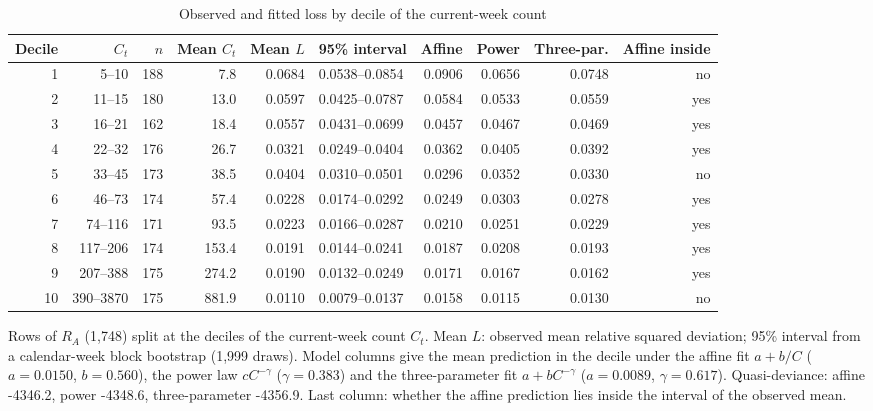 \begin{table}[!tbp]
\centering
\scriptsize\renewcommand{\arraystretch}{1.15}
\setlength{\tabcolsep}{3pt}
\caption{Observed and fitted loss by decile of the current-week count}
\label{tab:r2-deciles}
\begin{tabularx}{\linewidth}{@{}rrrrrlrrrr@{}}
\toprule
Decile & $C_t$ & $n$ & Mean $C_t$ & Mean $L$ & 95\% interval & Affine & Power & Three-par. & Affine inside \\
\midrule
1 & 5--10 & 188 & 7.8 & 0.0684 & 0.0538--0.0854 & 0.0906 & 0.0656 & 0.0748 & no \\
2 & 11--15 & 180 & 13.0 & 0.0597 & 0.0425--0.0787 & 0.0584 & 0.0533 & 0.0559 & yes \\
3 & 16--21 & 162 & 18.4 & 0.0557 & 0.0431--0.0699 & 0.0457 & 0.0467 & 0.0469 & yes \\
4 & 22--32 & 176 & 26.7 & 0.0321 & 0.0249--0.0404 & 0.0362 & 0.0405 & 0.0392 & yes \\
5 & 33--45 & 173 & 38.5 & 0.0404 & 0.0310--0.0501 & 0.0296 & 0.0352 & 0.0330 & no \\
6 & 46--73 & 174 & 57.4 & 0.0228 & 0.0174--0.0292 & 0.0249 & 0.0303 & 0.0278 & yes \\
7 & 74--116 & 171 & 93.5 & 0.0223 & 0.0166--0.0287 & 0.0210 & 0.0251 & 0.0229 & yes \\
8 & 117--206 & 174 & 153.4 & 0.0191 & 0.0144--0.0241 & 0.0187 & 0.0208 & 0.0193 & yes \\
9 & 207--388 & 175 & 274.2 & 0.0190 & 0.0132--0.0249 & 0.0171 & 0.0167 & 0.0162 & yes \\
10 & 390--3870 & 175 & 881.9 & 0.0110 & 0.0079--0.0137 & 0.0158 & 0.0115 & 0.0130 & no \\
\bottomrule
\end{tabularx}
\par\smallskip\parbox{\linewidth}{\scriptsize\linespread{1.15}\selectfont Rows of $R_A$ (1,748) split at the deciles of the current-week count $C_t$. Mean $L$: observed mean relative squared deviation; 95\% interval from a calendar-week block bootstrap (1,999 draws). Model columns give the mean prediction in the decile under the affine fit $a+b/C$ ($a=0.0150$, $b=0.560$), the power law $cC^{-\gamma}$ ($\gamma=0.383$) and the three-parameter fit $a+bC^{-\gamma}$ ($a=0.0089$, $\gamma=0.617$). Quasi-deviance: affine -4346.2, power -4348.6, three-parameter -4356.9. Last column: whether the affine prediction lies inside the interval of the observed mean.}
\end{table}
